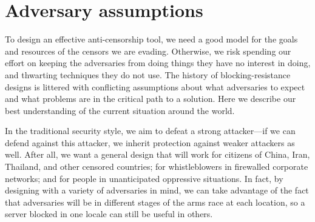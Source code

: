 \documentclass{llncs}
\begin{document}
\section{Adversary assumptions}
\label{sec:adversary}

To design an effective anti-censorship tool, we need a good model for the
goals and resources of the censors we are evading.  Otherwise, we risk
spending our effort on keeping the adversaries from doing things they have no
interest in doing, and thwarting techniques they do not use.
The history of blocking-resistance designs is littered with conflicting
assumptions about what adversaries to expect and what problems are
in the critical path to a solution. Here we describe our best
understanding of the current situation around the world.

In the traditional security style, we aim to defeat a strong
attacker---if we can defend against this attacker, we inherit protection
against weaker attackers as well.  After all, we want a general design
that will work for citizens of China, Iran, Thailand, and other censored
countries; for
whistleblowers in firewalled corporate networks; and for people in
unanticipated oppressive situations. In fact, by designing with
a variety of adversaries in mind, we can take advantage of the fact that
adversaries will be in different stages of the arms race at each location,
so a server blocked in one locale can still be useful in others.
\end{document}
